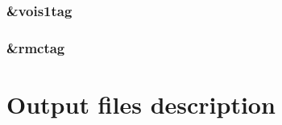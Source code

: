 \documentclass[a4paper,8pt]{article}
\begin{document}
\subsubsection{\&vois1tag }
\subsubsection{\&rmctag }

\section{Output files description}



\end{document}
